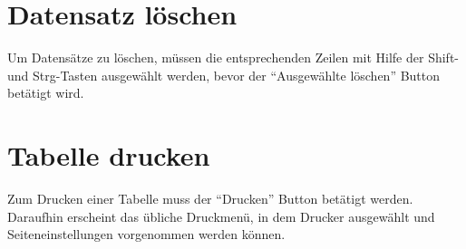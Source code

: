 	\section{Datensatz löschen}
		Um Datensätze zu löschen, müssen die entsprechenden Zeilen mit Hilfe der
		Shift- und Strg-Tasten ausgewählt werden, bevor der ``Ausgewählte löschen''
		Button betätigt wird.
		
	\section{Tabelle drucken}
		Zum Drucken einer Tabelle muss der ``Drucken'' Button betätigt werden.
		Daraufhin erscheint das übliche Druckmenü, in dem Drucker ausgewählt und
		Seiteneinstellungen vorgenommen werden können.
	